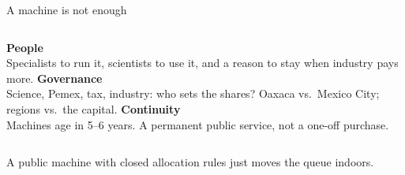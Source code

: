 \documentclass[aspectratio=169,11pt]{beamer}
\begin{document}
\begin{frame}{A machine is not enough}
\begin{columns}[T]
{\Large\bfseries\color{jade}People}\\[4pt]
\small Specialists to run it, scientists to use it, and a reason to stay when industry pays more.
{\Large\bfseries\color{jade}Governance}\\[4pt]
\small Science, Pemex, tax, industry: who sets the shares? Oaxaca vs.\ Mexico City; regions vs.\ the capital.
{\Large\bfseries\color{jade}Continuity}\\[4pt]
\small Machines age in 5--6 years. A permanent public service, not a one-off purchase.
\end{columns}
\vspace{1.5em}
\begin{center}\color{mute}A public machine with closed allocation rules just moves the queue indoors.\end{center}
\end{frame}
\end{document}
